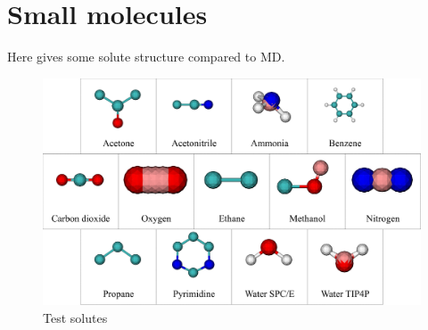 \section{Small molecules}

Here gives some solute structure compared to \acs{MD}.

\begin{figure}[h]
\begin{centering}
\includegraphics[width=1\columnwidth]{_figure/app_solute_var}
\par\end{centering}
\caption{Test solutes\label{fig:Test-solutes-2}}
\end{figure}


